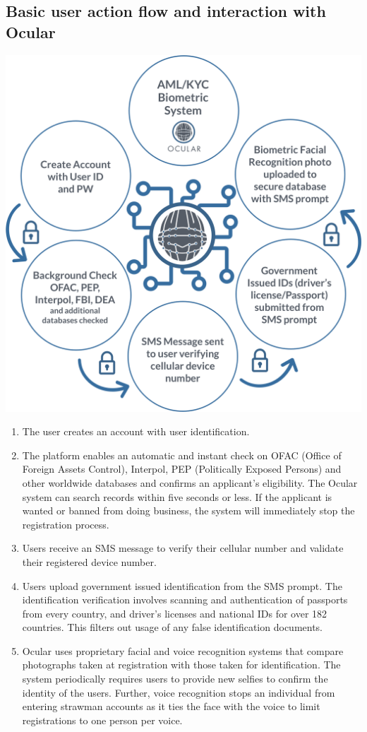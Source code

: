 \documentclass[a4paper]{article}
\begin{document}
\subsection{Basic user action flow and interaction with Ocular}
\centerline{\includegraphics[width=1.1\textwidth]{biometric2}}
\begin{enumerate}
\item The user creates an account with user identification.
\item The platform enables an automatic and instant check on OFAC (Office of Foreign Assets Control), Interpol, PEP (Politically Exposed Persons) and other worldwide databases and confirms an applicant’s eligibility. The Ocular system can search records within five seconds or less. If the applicant is wanted or banned from doing business, the system will immediately stop the registration process.
\item Users receive an SMS message to verify their cellular number and validate their registered device number.
\item Users upload government issued identification from the SMS prompt. The identification verification involves scanning and authentication of passports from every country, and driver's licenses and national IDs for over 182 countries. This filters out usage of any false identification documents.
\item Ocular uses proprietary facial and voice recognition systems that compare photographs taken at registration with those taken for identification. The system periodically requires users to provide new selfies to confirm the identity of the users. Further, voice recognition stops an individual from entering strawman accounts as it ties the face with the voice to limit registrations to one person per voice.
\end{enumerate}
\end{document}
